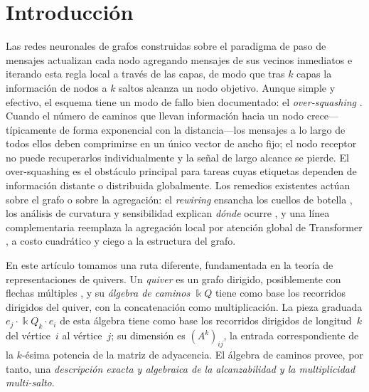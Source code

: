 \documentclass[runningheads]{llncs}
\newcommand{\kk}{\Bbbk}
\newcommand{\kQ}{\kk Q}
\newcommand{\Adj}{A}
\begin{document}
\section{Introducción}

Las redes neuronales de grafos construidas sobre el paradigma de paso de
mensajes \cite{gilmer2017neural} actualizan cada nodo agregando mensajes de sus
vecinos inmediatos e iterando esta regla local a través de las capas, de modo
que tras $k$ capas la información de nodos a $k$ saltos alcanza un nodo
objetivo. Aunque simple y efectivo, el esquema tiene un modo de fallo bien
documentado: el \emph{over-squashing} \cite{alon2021bottleneck}. Cuando el
número de caminos que llevan información hacia un nodo crece---típicamente de
forma exponencial con la distancia---los mensajes a lo largo de todos ellos
deben comprimirse en un único vector de ancho fijo; el nodo receptor no puede
recuperarlos individualmente y la señal de largo alcance se pierde. El
over-squashing es el obstáculo principal para tareas cuyas etiquetas dependen
de información distante o distribuida globalmente. Los remedios existentes
actúan sobre el grafo o sobre la agregación: el \emph{rewiring} ensancha los
cuellos de botella \cite{topping2022understanding}, los análisis de curvatura y
sensibilidad explican \emph{dónde} ocurre \cite{digiovanni2023oversquashing},
y una línea complementaria reemplaza la agregación local por atención global de
Transformer \cite{vaswani2017attention}, a costo cuadrático y ciego a la
estructura del grafo.

En este artículo tomamos una ruta diferente, fundamentada en la teoría de
representaciones de quivers. Un \emph{quiver} es un grafo dirigido,
posiblemente con flechas múltiples \cite{schiffler2014quiver,assem2006elements},
y su \emph{álgebra de caminos} $\kQ$ tiene como base los recorridos dirigidos
del quiver, con la concatenación como multiplicación. La pieza graduada
$e_j\cdot\kQ_k\cdot e_i$ de esta álgebra tiene como base los recorridos
dirigidos de longitud~$k$ del vértice~$i$ al vértice~$j$; su dimensión es
$(\Adj^k)_{ij}$, la entrada correspondiente de la $k$-ésima potencia de la
matriz de adyacencia. El álgebra de caminos provee, por tanto, una
\emph{descripción exacta y algebraica de la alcanzabilidad y la multiplicidad
multi-salto}.
\end{document}
